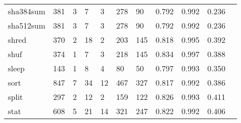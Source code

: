 \begin{longtable}{lp{1.10cm}p{1.10cm}p{1.10cm}p{1.10cm}p{1.10cm}p{1.10cm}p{1.10cm}p{1.10cm}p{1.10cm}p{1.10cm}}
sha384sum &                    381 &                                  3 &                                 7 &                                3 &                               278 &                              90 &                             0.792 &                                 0.992 &                               0.236 \\
sha512sum &                    381 &                                  3 &                                 7 &                                3 &                               278 &                              90 &                             0.792 &                                 0.992 &                               0.236 \\
shred     &                    370 &                                  2 &                                18 &                                2 &                               203 &                             145 &                             0.818 &                                 0.995 &                               0.392 \\
shuf      &                    374 &                                  1 &                                 7 &                                3 &                               218 &                             145 &                             0.834 &                                 0.997 &                               0.388 \\
sleep     &                    143 &                                  1 &                                 8 &                                4 &                                80 &                              50 &                             0.797 &                                 0.993 &                               0.350 \\
sort      &                    847 &                                  7 &                                34 &                               12 &                               467 &                             327 &                             0.817 &                                 0.992 &                               0.386 \\
split     &                    297 &                                  2 &                                12 &                                2 &                               159 &                             122 &                             0.826 &                                 0.993 &                               0.411 \\
stat      &                    608 &                                  5 &                                21 &                               14 &                               321 &                             247 &                             0.822 &                                 0.992 &                               0.406 \\

\end{longtable}

